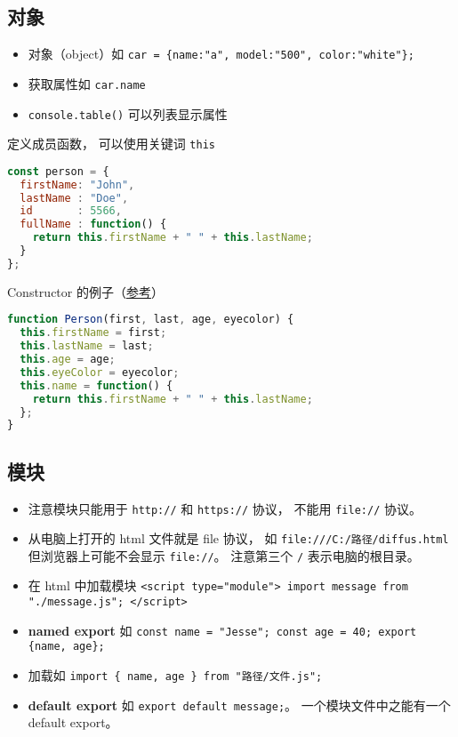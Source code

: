 \subsection{对象}
\begin{itemize}
\item 对象（object）如 \verb|car = {name:"a", model:"500", color:"white"};|
\item 获取属性如 \verb|car.name|
\item \verb|console.table()| 可以列表显示属性
\end{itemize}

定义成员函数， 可以使用关键词 \verb|this|
\begin{lstlisting}[language=js]
const person = {
  firstName: "John",
  lastName : "Doe",
  id       : 5566,
  fullName : function() {
    return this.firstName + " " + this.lastName;
  }
};
\end{lstlisting}

Constructor 的例子（\href{https://www.w3schools.com/js/js_object_constructors.asp}{参考}）
\begin{lstlisting}[language=js]
function Person(first, last, age, eyecolor) {
  this.firstName = first;
  this.lastName = last;
  this.age = age;
  this.eyeColor = eyecolor;
  this.name = function() {
    return this.firstName + " " + this.lastName;
  };
}
\end{lstlisting}

\subsection{模块}
\begin{itemize}
\item 注意模块只能用于 \verb|http://| 和 \verb|https://| 协议， 不能用 \verb|file://| 协议。
\item 从电脑上打开的 html 文件就是 file 协议， 如 \verb|file:///C:/路径/diffus.html| 但浏览器上可能不会显示 \verb|file://|。 注意第三个 \verb|/| 表示电脑的根目录。
\item 在 html 中加载模块 \verb|<script type="module"> import message from "./message.js"; </script>|
\item \textbf{named export} 如 \verb|const name = "Jesse"; const age = 40; export {name, age};|
\item 加载如 \verb|import { name, age } from "路径/文件.js";|
\item \textbf{default export} 如 \verb|export default message;|。 一个模块文件中之能有一个 default export。
\end{itemize}

